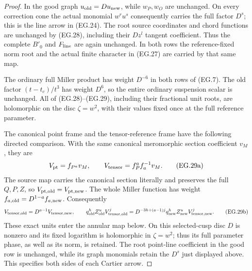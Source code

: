 \begin{proof}
In the good graph \(u_{\rm old}=D u_{\rm new}\),
while \(w_P,w_O\) are unchanged. On every correction
cone the actual monomial \(w^r u^s\) consequently carries
the full factor \(D^s\); this is the line arrow in
(EG.24). The root source coordinates and chord functions
are unchanged by (EG.28), including their \(D z^l\)
tangent coefficient. Thus the complete \(B'_0\) and
\(F_{\rm line}\) are again unchanged. In both rows the
reference-fixed norm root and the actual finite
character in (EG.27) are carried by that same map.

The ordinary full Miller product has weight \(D^{-6}\)
in both rows of (EG.7). The old factor
\((t-t_c)/t^3\) has weight \(D^6\), so the entire
ordinary suspension scalar is unchanged. All of
(EG.28)--(EG.29), including their fractional unit roots,
are holomorphic on the disc \(\zeta=w^2\), with their
values fixed once at the full reference parameter.

The canonical point frame and the tensor-reference frame have the
following directed comparison. With the same canonical meromorphic
section coefficient \(v_M\), they are
\[
 V_{\rm pt}=f_{P^a}v_M,\qquad
 V_{\rm tensor}=f_P^a f_a^{-1}v_M.
 \tag{EG.29a}
\]
The source map carries the canonical section literally and preserves
the full \(Q,P,Z\), so \(V_{{\rm pt},{\rm old}}=V_{{\rm pt},{\rm new}}\).
The whole Miller function has weight
\(f_{a,{\rm old}}=D^{1-a}f_{a,{\rm new}}\). Consequently
\[
 V_{{\rm tensor},{\rm old}}=D^{a-1}V_{{\rm tensor},{\rm new}},\qquad
 q_{\rm old}^{h}Z_{\rm old}^{u}V_{{\rm tensor},{\rm old}}^{j}
 =D^{-3h+(a-1)j}q_{\rm new}^{h}Z_{\rm new}^{u}
                     V_{{\rm tensor},{\rm new}}^{j}.
 \tag{EG.29b}
\]
These exact units enter the annular map below. On this selected-cusp
disc \(D\) is nonzero and its fixed logarithm is holomorphic in
\(\zeta=w^2\); thus its full parameter phase, as well as its norm,
is retained. The root point-line coefficient in the good row is
unchanged, while its graph monomials retain the \(D^s\) just displayed
above. This specifies both sides of each Cartier arrow.


\end{proof}
